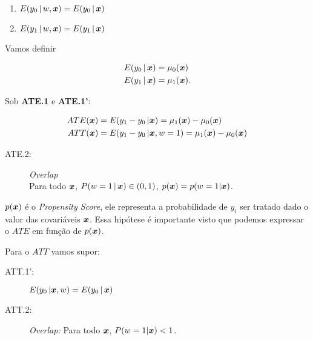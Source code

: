 \documentclass[11pt,oneside,a4paper]{article}
\numberwithin{equation}{section}
\begin{document}
\begin{description}
\begin{description}
\begin{description}
\vspace{-.75 em}
\begin{enumerate}[label =\alph*)] \itemsep0pt
\item $E( y_{0} \, | \, w, \boldsymbol{x} ) = E( y_{0} \, | \, \boldsymbol{x} )$
\item $E( y_{1} \, | \, w, \boldsymbol{x} ) = E( y_{1} \, | \, \boldsymbol{x} )$
\end{enumerate}

\end{description}

Vamos definir

\vspace{-1 em}
\begin{align*}
E( y_{0} \, | \, \boldsymbol{x} ) &= \mu_{0}( \boldsymbol{x} )
\\
E( y_{1} \, | \, \boldsymbol{x} ) &= \mu_{1}( \boldsymbol{x} ).
\end{align*}

Sob \textbf{ATE.1} e \textbf{ATE.1'}:

\vspace{-1 em}
\begin{align*}
	ATE( \boldsymbol{x} ) &= E( y_{1} - y_{0} \, | \boldsymbol{x} ) = \mu_{1}(\boldsymbol{x}) - \mu_{0}(\boldsymbol{x}) 
	\\
	ATT( \boldsymbol{x} ) &= E( y_{1} - y_{0} \, | \boldsymbol{x}, w=1 ) = \mu_{1}(\boldsymbol{x}) - \mu_{0}(\boldsymbol{x}) 
\end{align*}

\begin{description}
\item[ATE.2:] \textit{Overlap} \\
Para todo $\boldsymbol{x}$, $P(w=1 \, | \, \boldsymbol{x} ) \in ( 0, 1 )$, 
$p(\boldsymbol{x}) = p(w=1 | \boldsymbol{x})$.
\end{description}

$p(\boldsymbol{x})$ é o \textit{Propensity Score}, ele representa a probabilidade de $y_{i}$ ser tratado dado o valor das covariáveis $\boldsymbol{x}$.
Essa hipótese é importante visto que podemos expressar o $ATE$ em função de $p(\boldsymbol{x})$.

\vspace{1 em}
Para o $ATT$ vamos supor:

\begin{description}
\item[ATT.1':] 
	$E( y_{0} \, | \boldsymbol{x}, w ) = E( y_{0} \, | \, \boldsymbol{x} )$

\item[ATT.2:] \textit{Overlap:} Para todo $\boldsymbol{x}$, $P(w=1 | \boldsymbol{x} ) < 1$.
\end{description}


\end{description}
\end{description}
\end{document}
